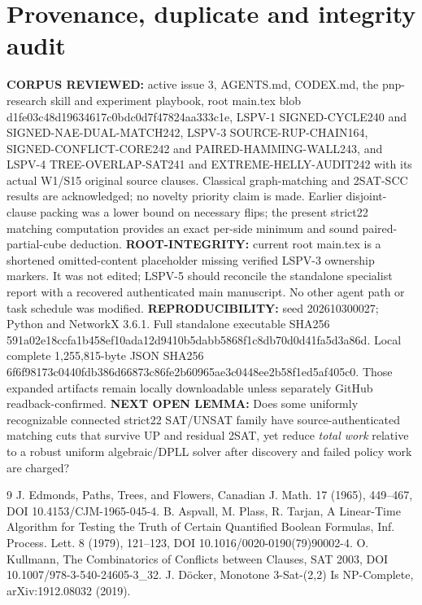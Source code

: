 \documentclass{article}
\begin{document}
\section*{Provenance, duplicate and integrity audit}
\textbf{CORPUS REVIEWED:} active issue 3, AGENTS.md, CODEX.md, the pnp-research skill and experiment playbook, root main.tex blob d1fe03c48d19634617c0bdc0d7f47824aa333c1e, LSPV-1 SIGNED-CYCLE240 and SIGNED-NAE-DUAL-MATCH242, LSPV-3 SOURCE-RUP-CHAIN164, SIGNED-CONFLICT-CORE242 and PAIRED-HAMMING-WALL243, and LSPV-4 TREE-OVERLAP-SAT241 and EXTREME-HELLY-AUDIT242 with its actual W1/S15 original source clauses. Classical graph-matching and 2SAT-SCC results are acknowledged; no novelty priority claim is made. Earlier disjoint-clause packing was a lower bound on necessary flips; the present strict22 matching computation provides an exact per-side minimum and sound paired-partial-cube deduction.
\textbf{ROOT-INTEGRITY:} current root main.tex is a shortened omitted-content placeholder missing verified LSPV-3 ownership markers. It was not edited; LSPV-5 should reconcile the standalone specialist report with a recovered authenticated main manuscript. No other agent path or task schedule was modified.
\textbf{REPRODUCIBILITY:} seed 202610300027; Python and NetworkX 3.6.1. Full standalone executable SHA256 591a02e18ccfa1b458ef10ada12d9410b5dabb5868f1c8db70d0d41fa5d3a86d. Local complete 1,255,815-byte JSON SHA256 6f6f98173c0440fdb386d66873c86fe2b60965ae3c0448ee2b58f1ed5af405c0. Those expanded artifacts remain locally downloadable unless separately GitHub readback-confirmed.
\textbf{NEXT OPEN LEMMA:} Does some uniformly recognizable connected strict22 SAT/UNSAT family have source-authenticated matching cuts that survive UP and residual 2SAT, yet reduce \emph{total work} relative to a robust uniform algebraic/DPLL solver after discovery and failed policy work are charged?
\begin{thebibliography}{9}
 J. Edmonds, Paths, Trees, and Flowers, Canadian J. Math. 17 (1965), 449--467, DOI 10.4153/CJM-1965-045-4.
 B. Aspvall, M. Plass, R. Tarjan, A Linear-Time Algorithm for Testing the Truth of Certain Quantified Boolean Formulas, Inf. Process. Lett. 8 (1979), 121--123, DOI 10.1016/0020-0190(79)90002-4.
 O. Kullmann, The Combinatorics of Conflicts between Clauses, SAT 2003, DOI 10.1007/978-3-540-24605-3\_32.
 J. D\"ocker, Monotone 3-Sat-(2,2) Is NP-Complete, arXiv:1912.08032 (2019).
\end{thebibliography}
\end{document}
